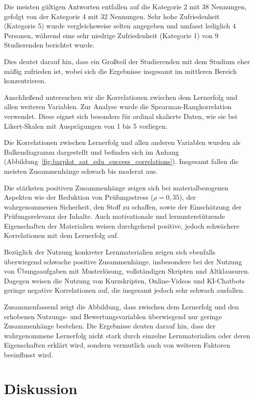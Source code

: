 \documentclass[a4paper,12pt]{article}
\begin{document}
Die meisten gültigen Antworten entfallen auf die Kategorie 2 mit 38 Nennungen, gefolgt von der Kategorie 4 mit 32 Nennungen. Sehr hohe Zufriedenheit (Kategorie 5) wurde vergleichsweise selten angegeben und umfasst lediglich 4 Personen, während eine sehr niedrige Zufriedenheit (Kategorie 1) von 9 Studierenden berichtet wurde.

Dies deutet darauf hin, dass ein Großteil der Studierenden mit dem Studium eher mäßig zufrieden ist, wobei sich die Ergebnisse insgesamt im mittleren Bereich konzentrieren.

Anschließend untersuchen wir die Korrelationen zwischen dem Lernerfolg und allen weiteren Variablen. Zur Analyse wurde die Spearman-Rangkorrelation verwendet. Diese eignet sich besonders für ordinal skalierte Daten, wie sie bei Likert-Skalen mit Ausprägungen von 1 bis 5 vorliegen.

Die Korrelationen zwischen Lernerfolg und allen anderen Variablen wurden als Balkendiagramm dargestellt und befinden sich im Anhang (Abbildung~\ref{fig:barplot_sat_edu_success_correlations}). Insgesamt fallen die meisten Zusammenhänge schwach bis moderat aus.

Die stärksten positiven Zusammenhänge zeigen sich bei materialbezogenen Aspekten wie der Reduktion von Prüfungsstress ($\rho = 0{,}35$), der wahrgenommenen Sicherheit, den Stoff zu schaffen, sowie der Einschätzung der Prüfungsrelevanz der Inhalte. Auch motivationale und lernunterstützende Eigenschaften der Materialien weisen durchgehend positive, jedoch schwächere Korrelationen mit dem Lernerfolg auf.

Bezüglich der Nutzung konkreter Lernmaterialien zeigen sich ebenfalls überwiegend schwache positive Zusammenhänge, insbesondere bei der Nutzung von Übungsaufgaben mit Musterlösung, vollständigen Skripten und Altklausuren. Dagegen weisen die Nutzung von Kurzskripten, Online-Videos und KI-Chatbots geringe negative Korrelationen auf, die insgesamt jedoch sehr schwach ausfallen.

Zusammenfassend zeigt die Abbildung, dass zwischen dem Lernerfolg und den erhobenen Nutzungs- und Bewertungsvariablen überwiegend nur geringe Zusammenhänge bestehen. Die Ergebnisse deuten darauf hin, dass der wahrgenommene Lernerfolg nicht stark durch einzelne Lernmaterialien oder deren Eigenschaften erklärt wird, sondern vermutlich auch von weiteren Faktoren beeinflusst wird.

\section{Diskussion}
\end{document}
